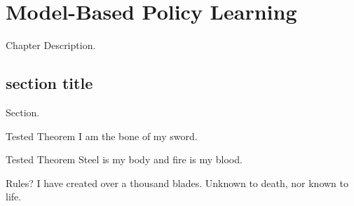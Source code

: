 \chapter{Model-Based Policy Learning}
Chapter Description.
\section{section title}
Section.
\begin{ln-theorem}{Tested Theorem}{}
    I am the bone of my sword.
\end{ln-theorem}
\begin{ln-define}{Tested Theorem}{}
    Steel is my body and fire is my blood.
\end{ln-define}
\begin{ln-quest}{Rules?}{}
    I have created over a thousand blades.
    \tcblower
    Unknown to death, nor known to life.
\end{ln-quest}